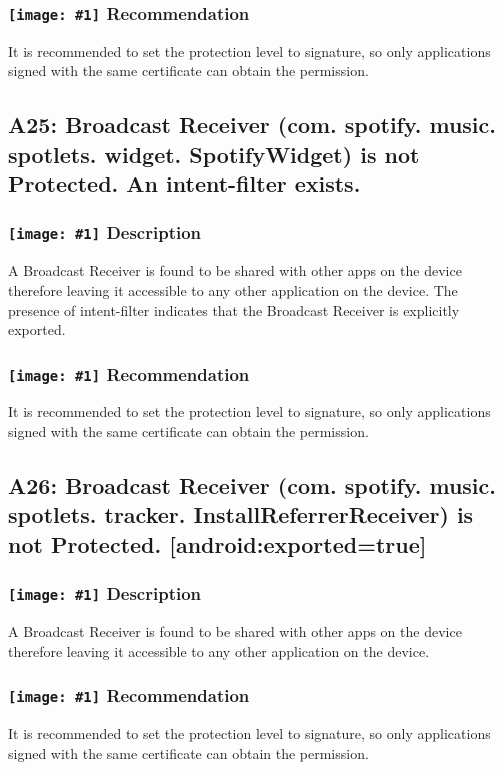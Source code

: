 \documentclass[12p]{article}
\newcommand{\icon}[1]{\texttt{[image: \#1]}}
\begin{document}
\subsubsection*{\protect\icon{/home/miki/Documents/GITHUB/AndroidPermissions/python/vulns/report_icons/basic_todo.png} Recommendation}
It is recommended to set the protection level to signature, so only applications signed with the same certificate can obtain the permission.
\subsection{A25: Broadcast Receiver (com. spotify. music. spotlets. widget. SpotifyWidget) is not Protected. An intent-filter exists.}
\subsubsection*{\protect\icon{/home/miki/Documents/GITHUB/AndroidPermissions/python/vulns/report_icons/basic_sheet.png} Description}
A  Broadcast Receiver is found to be shared with other apps on the device therefore leaving it accessible to any other application on the device. The presence of intent-filter indicates that the Broadcast Receiver is explicitly exported.
\subsubsection*{\protect\icon{/home/miki/Documents/GITHUB/AndroidPermissions/python/vulns/report_icons/basic_todo.png} Recommendation}
It is recommended to set the protection level to signature, so only applications signed with the same certificate can obtain the permission.
\subsection{A26: Broadcast Receiver (com. spotify. music. spotlets. tracker. InstallReferrerReceiver) is not Protected. [android:exported=true]}
\subsubsection*{\protect\icon{/home/miki/Documents/GITHUB/AndroidPermissions/python/vulns/report_icons/basic_sheet.png} Description}
A Broadcast Receiver is found to be shared with other apps on the device therefore leaving it accessible to any other application on the device.
\subsubsection*{\protect\icon{/home/miki/Documents/GITHUB/AndroidPermissions/python/vulns/report_icons/basic_todo.png} Recommendation}
It is recommended to set the protection level to signature, so only applications signed with the same certificate can obtain the permission.
\end{document}
